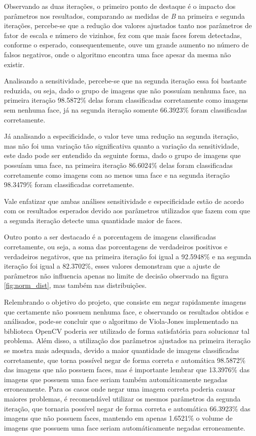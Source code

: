 Observando as duas iterações, o primeiro ponto de destaque é o impacto dos parâmetros nos resultados, comparando as medidas de \textit{B} na primeira e segunda iterações, percebe-se que a redução dos valores ajustados tanto nos parâmetros de fator de escala e número de vizinhos, fez com que mais faces forem detectadas, conforme o esperado, consequentemente, ouve um grande aumento no número de falsos negativos, onde o algoritmo encontra uma face apesar da mesma não existir. 

Analisando a sensitividade, percebe-se que na segunda iteração essa foi bastante reduzida, ou seja, dado o grupo de imagens que não possuíam nenhuma face, na primeira iteração 98.5872\% delas foram classificadas corretamente como imagens sem nenhuma face, já na segunda iteração somente 66.3923\% foram classificadas corretamente.

Já analisando a especificidade, o valor teve uma redução na segunda iteração, mas não foi uma variação tão significativa quanto a variação da sensitividade, este dado pode ser entendido da seguinte forma, dado o grupo de imagens que possuíam uma face, na primeira iteração 86.6024\% delas foram classificadas corretamente como imagens com ao menos uma face e na segunda iteração 98.3479\% foram classificadas corretamente.

Vale enfatizar que ambas análises sensitividade e especificidade estão de acordo com os resultados esperados devido aos parâmetros utilizados que fazem com que a segunda iteração detecte uma quantidade maior de faces.

Outro ponto a ser destacado é a porcentagem de imagens classificadas corretamente, ou seja, a soma das porcentagens de verdadeiros positivos e verdadeiros negativos, que na primeira iteração foi igual a 92.5948\% e na segunda iteração foi igual a 82.3702\%, esses valores demonstram que a ajuste de parâmetros não influencia apenas no limite de decisão observado na figura \ref{fig:norm_dist}, mas também nas distribuições.

Relembrando o objetivo do projeto, que consiste em negar rapidamente imagens que certamente não possuem nenhuma face, e observando os resultados obtidos e análisados, pode-se concluir que o algoritmo de Viola-Jones implementado na biblioteca OpenCV poderia ser utilizado de forma satisfatória para solucionar tal problema. Além disso, a utilização dos parâmetros ajustados na primeira iteração se mostra mais adequada, devido a maior quantidade de imagens classificadas corretamente, que torna possível negar de forma correta e automática 98.5872\% das imagens que não possuem faces, mas é importante lembrar que 13.3976\% das imagens que possuem uma face seriam também automáticamente negadas erroneamente. Para os casos onde negar uma imagem correta poderia causar maiores problemas, é recomendável utilizar os mesmos parâmetros da segunda iteração, que tornaria possível negar de forma correta e automática 66.3923\% das imagens que não possuem faces, mantendo em apenas 1.6521\% o volume de imagens que possuem uma face seriam  automáticamente negadas erroneamente.